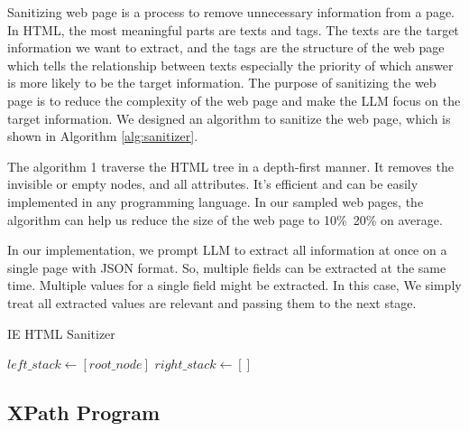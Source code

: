 \documentclass[a4paper]{article}
\begin{document}
Sanitizing web page is a process to remove unnecessary information from a page. In HTML, the most meaningful parts are texts and tags. The texts are the target information we want to extract, and the tags are the structure of the web page which tells the relationship between texts especially the priority of which answer is more likely to be the target information. The purpose of sanitizing the web page is to reduce the complexity of the web page and make the LLM focus on the target information. We designed an algorithm to sanitize the web page, which is shown in Algorithm \ref{alg:sanitizer}.

The algorithm 1 traverse the HTML tree in a depth-first manner. It removes the invisible or empty nodes, and all attributes. It's efficient and can be easily implemented in any programming language. In our sampled web pages, the algorithm can help us reduce the size of the web page to 10\%~20\% on average.

In our implementation, we prompt LLM to extract all information at once on a single page with JSON format. So, multiple fields can be extracted at the same time. Multiple values for a single field might be extracted. In this case, We simply treat all extracted values are relevant and passing them to the next stage.

\begin{algorithm}
  \SetAlgoLined
  \caption{IE HTML Sanitizer}
  \label{alg:sanitizer}
  
  $left\_stack \gets [root\_node]$\;
  $right\_stack \gets []$\;
  
  
\end{algorithm}

\subsection{XPath Program}
\end{document}
